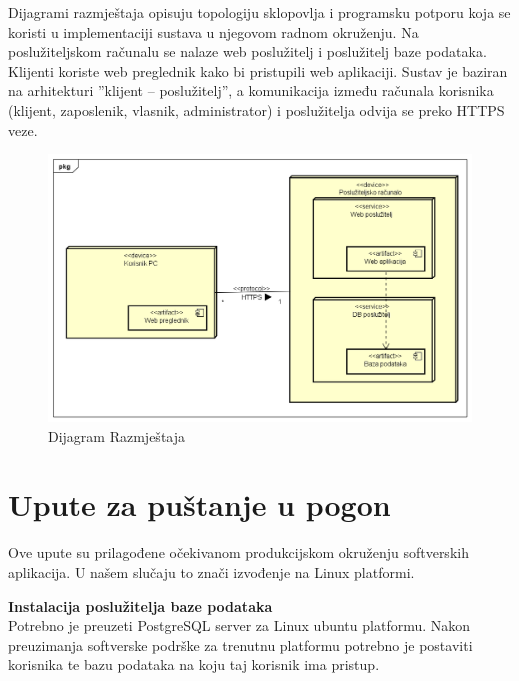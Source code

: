 			Dijagrami razmještaja opisuju topologiju sklopovlja i programsku potporu koja se koristi u implementaciji sustava u njegovom radnom okruženju. Na poslužiteljskom računalu se nalaze web poslužitelj i poslužitelj baze podataka. Klijenti koriste web preglednik kako bi pristupili web aplikaciji. Sustav je baziran na arhitekturi ”klijent – poslužitelj”, a komunikacija između računala korisnika (klijent, zaposlenik, vlasnik, administrator) i poslužitelja odvija se preko HTTPS veze.
			
			
			\begin{figure}[H]
				\includegraphics[width=\textwidth]{slike/DijagramRazmjestaja.png} %
				\caption{Dijagram Razmještaja}
				\label{fig:DijagramRazmještaja} %
			\end{figure}
			
			\eject 
		
		\section{Upute za puštanje u pogon}
		
		
			
			Ove upute su prilagođene očekivanom produkcijskom okruženju softverskih aplikacija. U našem slučaju to znači izvođenje na Linux platformi.
			
			\textbf{Instalacija poslužitelja baze podataka}\\
			
			Potrebno je preuzeti PostgreSQL server za Linux ubuntu platformu.
			Nakon preuzimanja softverske podrške za trenutnu platformu potrebno je postaviti korisnika te bazu podataka na koju taj korisnik ima pristup.\newline
			
